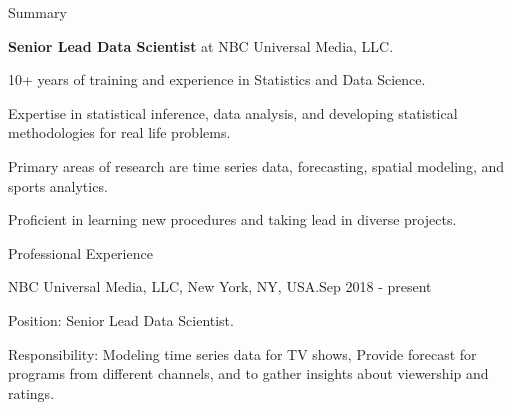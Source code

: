\documentclass{resume} %
\begin{document}

\begin{rSection}{Summary}

\begin{rSubsection}{}{}{}{}
\item {\bf Senior Lead Data Scientist} at NBC Universal Media, LLC.
\item 10+ years of training and experience in Statistics and Data Science.
\item Expertise in statistical inference, data analysis, and developing statistical methodologies for real life problems.
\item Primary areas of research are time series data, forecasting, spatial modeling, and sports analytics.
\item Proficient in learning new procedures and taking lead in diverse projects.
\end{rSubsection}
\end{rSection} 





\begin{rSection}{Professional Experience}

\begin{rSubsection}{NBC Universal Media, LLC, New York, NY, USA.}{{Sep 2018 - present}}{}{}
\item {Position}: Senior Lead Data Scientist. 
\item {Responsibility}: Modeling time series data for TV shows, Provide forecast for programs from different channels, and to gather insights about viewership and ratings.
\end{rSubsection}

\end{rSection}


\end{document}
